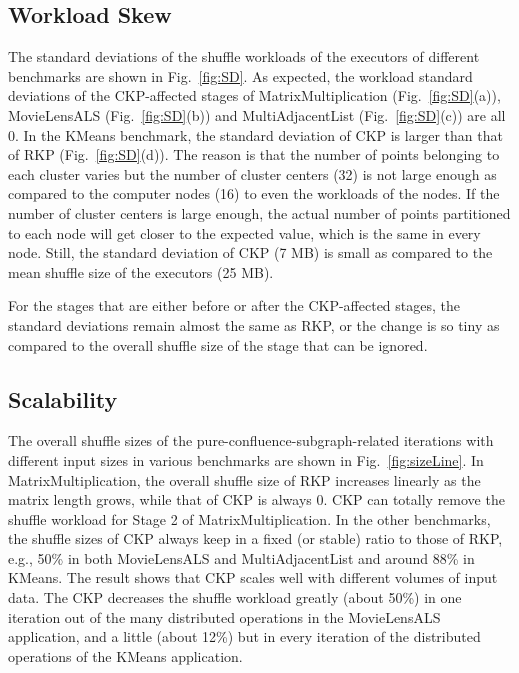 \documentclass[10pt,journal,compsoc]{IEEEtran}
\begin{document}
\subsection{Workload Skew}
The standard deviations of the shuffle workloads of the executors of different benchmarks are shown in Fig.~\ref{fig:SD}. 
As expected, the workload standard deviations of the CKP-affected stages of MatrixMultiplication (Fig.~\ref{fig:SD}(a)), MovieLensALS (Fig.~\ref{fig:SD}(b)) and MultiAdjacentList (Fig.~\ref{fig:SD}(c)) are all 0. 
In the KMeans benchmark, the standard deviation of CKP is larger than that of RKP (Fig.~\ref{fig:SD}(d)). 
The reason is that the number of points belonging to each cluster varies but the number of cluster centers (32) is not large enough as compared to 
the computer nodes (16) to even the workloads of the nodes. 
If the number of cluster centers is large enough, the actual number of points partitioned to each node will get closer to the expected value, 
which is the same in every node.
Still, the standard deviation of CKP (7 MB) is small as compared to the mean shuffle size of the executors (25 MB).

For the stages that are either before or after the CKP-affected stages, the standard deviations remain almost the same as RKP, or the change is so tiny as compared to the overall shuffle size of the stage that can be ignored. 




\subsection{Scalability}
The overall shuffle sizes of the pure-confluence-subgraph-related iterations with different input sizes in various benchmarks are shown in Fig.~\ref{fig:sizeLine}. 
In MatrixMultiplication, 
the overall shuffle size of RKP increases linearly as the matrix length grows, while that of CKP is always 0. 
CKP can totally remove the shuffle workload for Stage 2 of MatrixMultiplication. 
In the other benchmarks, the shuffle sizes of CKP always keep in a fixed (or stable) ratio to those of RKP, e.g., 50\% in both MovieLensALS and MultiAdjacentList and around 88\% in KMeans. 
The result shows that CKP scales well with different volumes of input data. 
The CKP decreases the shuffle workload greatly (about 50\%) in one iteration out of the many distributed operations in the MovieLensALS application, and a little (about 12\%) but in every iteration of the distributed operations of the KMeans application. 
\end{document}
